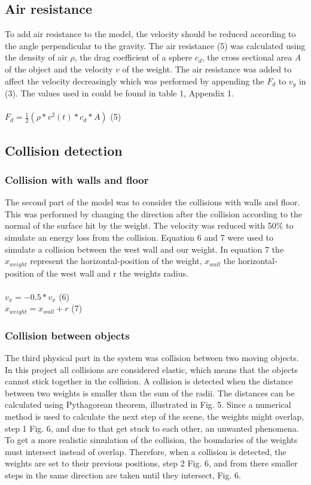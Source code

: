 \documentclass[a4paper,12pt,twoside,english]{article}
\begin{document}
 
\subsection{Air resistance}
To add air resistance to the model, the velocity should be reduced according to the angle perpendicular to the gravity. The air resistance (5) was calculated using the density of air ${\rho}$, the drag coefficient of a sphere $c_d$, the cross sectional area {\itshape A}  of the object and the velocity $v$ of the weight.
The air resistance was added to affect the velocity decreasingly which was performed by appending the $F_d$ to $v_y$ in (3). The values used in could be found in table 1, Appendix 1. \\ \\
$F_d = \frac{1}{2}( \rho * v^2(t) * c_{d} * A)$ \hfill (5) 

\subsection{Collision detection}
\subsubsection{Collision with walls and floor}
The second part of the model was to consider the collisions with walls and floor. This was performed by changing the direction after the collision according to the normal of the surface hit by the weight. The velocity was reduced with 50\%  to simulate an energy loss from the collision.  Equation 6 and 7 were used to simulate a collision between the west wall and our weight. In equation 7 the $x_{weight}$ represent the horizontal-position of the weight, $x_{wall}$ the horizontal-position of the west wall and r the weights radius.  \\ \\
$v_x= -0.5*v_x$ \hfill (6) \\
$x_{weight} = x_{wall}+ r$ \hfill (7)

\subsubsection{Collision between objects}
The third physical part in the system was collision between two moving objects. In this project all collisions are considered elastic, which means that the objects cannot stick together in the collision.
A collision is detected when the distance between two weights is smaller than the sum of the radii. The distances can be calculated using Pythagorean theorem, illustrated in Fig. 5. 
Since a numerical method is used to calculate the next step of the scene, the weights might overlap, step 1 Fig. 6, and due to that get stuck to each other, an unwanted phenomena. To get a more realistic simulation of the collision, the boundaries of the weights must intersect instead of overlap. Therefore, when a collision is detected, the weights are set to their previous positions, step 2 Fig. 6, and from there smaller steps in the same direction are taken until they intersect, Fig. 6. 
\end{document}

